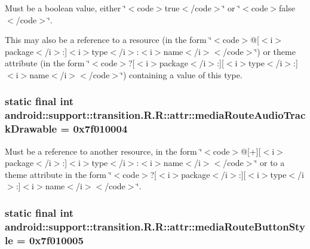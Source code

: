 Must be a boolean value, either \char`\"{}$<$code$>$true$<$/code$>$\char`\"{} or \char`\"{}$<$code$>$false$<$/code$>$\char`\"{}. 

This may also be a reference to a resource (in the form \char`\"{}$<$code$>$@\mbox{[}$<$i$>$package$<$/i$>$:\mbox{]}$<$i$>$type$<$/i$>$:$<$i$>$name$<$/i$>$$<$/code$>$\char`\"{}) or theme attribute (in the form \char`\"{}$<$code$>$?\mbox{[}$<$i$>$package$<$/i$>$:\mbox{]}\mbox{[}$<$i$>$type$<$/i$>$:\mbox{]}$<$i$>$name$<$/i$>$$<$/code$>$\char`\"{}) containing a value of this type. \hypertarget{classandroid_1_1support_1_1transition_1_1_r_1_1attr_e64ba5b0430421a6169f4a32e72875c6}{
\subsubsection[{mediaRouteAudioTrackDrawable}]{\setlength{\rightskip}{0pt plus 5cm}static final int android::support::transition.R.R::attr::mediaRouteAudioTrackDrawable = 0x7f010004}}
\label{classandroid_1_1support_1_1transition_1_1_r_1_1attr_e64ba5b0430421a6169f4a32e72875c6}


Must be a reference to another resource, in the form \char`\"{}$<$code$>$@\mbox{[}+\mbox{]}\mbox{[}$<$i$>$package$<$/i$>$:\mbox{]}$<$i$>$type$<$/i$>$:$<$i$>$name$<$/i$>$$<$/code$>$\char`\"{} or to a theme attribute in the form \char`\"{}$<$code$>$?\mbox{[}$<$i$>$package$<$/i$>$:\mbox{]}\mbox{[}$<$i$>$type$<$/i$>$:\mbox{]}$<$i$>$name$<$/i$>$$<$/code$>$\char`\"{}. \hypertarget{classandroid_1_1support_1_1transition_1_1_r_1_1attr_ee6f9b1e2fd23eb486c56561171555cd}{
\subsubsection[{mediaRouteButtonStyle}]{\setlength{\rightskip}{0pt plus 5cm}static final int android::support::transition.R.R::attr::mediaRouteButtonStyle = 0x7f010005}}
\label{classandroid_1_1support_1_1transition_1_1_r_1_1attr_ee6f9b1e2fd23eb486c56561171555cd}


